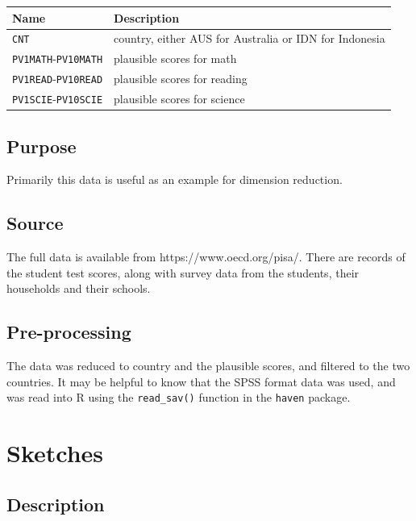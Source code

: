 \documentclass[
  letterpaper,
]{book}
\begin{document}
\begin{longtable}[]{@{}ll@{}}
\toprule()
Name & Description \\
\midrule()
\endhead
\texttt{CNT} & country, either AUS for Australia or IDN for Indonesia \\
\texttt{PV1MATH}-\texttt{PV10MATH} & plausible scores for math \\
\texttt{PV1READ}-\texttt{PV10READ} & plausible scores for reading \\
\texttt{PV1SCIE}-\texttt{PV10SCIE} & plausible scores for science \\
\bottomrule()
\end{longtable}

\hypertarget{purpose-4}{%
\subsection*{Purpose}\label{purpose-4}}

Primarily this data is useful as an example for dimension reduction.

\hypertarget{source-4}{%
\subsection*{Source}\label{source-4}}

The full data is available from https://www.oecd.org/pisa/. There are
records of the student test scores, along with survey data from the
students, their households and their schools.

\hypertarget{pre-processing-4}{%
\subsection*{Pre-processing}\label{pre-processing-4}}

The data was reduced to country and the plausible scores, and filtered
to the two countries. It may be helpful to know that the SPSS format
data was used, and was read into R using the \texttt{read\_sav()}
function in the \texttt{haven} package.

\hypertarget{sketches}{%
\section{Sketches}\label{sketches}}

\hypertarget{description-5}{%
\subsection*{Description}\label{description-5}}
\end{document}
